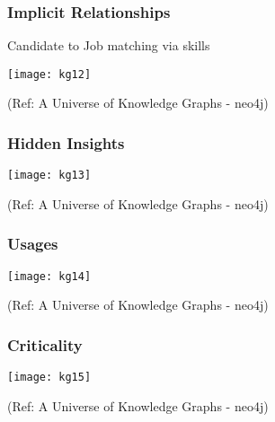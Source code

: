 \begin{frame}[fragile]\frametitle{Implicit Relationships}
 
	Candidate to Job matching via skills
 
			\begin{center}
			\texttt{[image: kg12]}
			\end{center}	
			
			{\tiny (Ref: A Universe of Knowledge Graphs - neo4j)}
		
	
\end{frame}

\begin{frame}[fragile]\frametitle{Hidden Insights}
 
 
			\begin{center}
			\texttt{[image: kg13]}
			\end{center}	
			
			{\tiny (Ref: A Universe of Knowledge Graphs - neo4j)}
		
	
\end{frame}

\begin{frame}[fragile]\frametitle{Usages}
 
 
			\begin{center}
			\texttt{[image: kg14]}
			\end{center}	
			
			{\tiny (Ref: A Universe of Knowledge Graphs - neo4j)}
		
	
\end{frame}

\begin{frame}[fragile]\frametitle{Criticality}
 
 
			\begin{center}
			\texttt{[image: kg15]}
			\end{center}	
			
			{\tiny (Ref: A Universe of Knowledge Graphs - neo4j)}
		
	
\end{frame}
